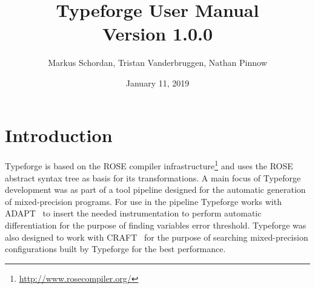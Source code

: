 \documentclass[natbib]{article}
\begin{document}
\title{Typeforge User Manual\\Version 1.0.0}

\author{\small Markus Schordan, Tristan Vanderbruggen, Nathan Pinnow}
\date{January 11, 2019}

\maketitle

%

\tableofcontents


\section{Introduction}
\label{sec:intro}

Typeforge is based on the ROSE compiler infrastructure\footnote{\url{http://www.rosecompiler.org/}} 
and uses the ROSE abstract syntax tree as basis for its transformations. 
A main focus of Typeforge development was as part of a tool pipeline designed for 
the automatic generation of mixed-precision programs. For use in the pipeline 
Typeforge works with ADAPT~\cite{adapt} to insert the needed instrumentation to 
perform automatic differentiation for the purpose of finding variables error threshold.
Typeforge was also designed to work with CRAFT~\cite{CRAFT2013PARCO,CRAFT2013ICS,CRAFT2016} 
for the purpose of searching mixed-precision configurations built by Typeforge 
for the best performance.
\end{document}
